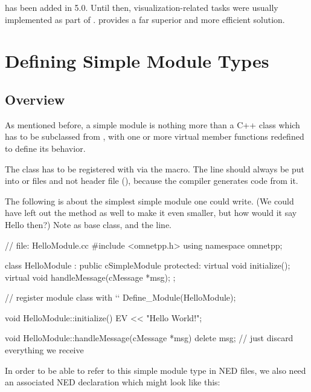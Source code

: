 \begin{note}
     has been added in {\opp} 5.0. Until then,
    visualization-related tasks were usually implemented as part of
    .  provides
    a far superior and more efficient solution.
\end{note}


\section{Defining Simple Module Types}
\label{sec:simple-modules:defining-simple-modules}

\subsection{Overview}
\label{sec:simple-modules:defining:overview}

As mentioned before, a simple module is nothing more
than a C++ class which has to be subclassed from ,
with one or more virtual member functions redefined to define its behavior.

The class has to be registered with {\opp} via the  macro.
The  line should always be put into  or 
files and not header file (), because the compiler generates code from it.

The following  is about the simplest simple module one could write.
(We could have left out the  method as well to make it even smaller,
but how would it say Hello then?) Note  as base class,
and the  line.

\begin{cpp}
// file: HelloModule.cc
#include <omnetpp.h>
using namespace omnetpp;

class HelloModule : public cSimpleModule
{
  protected:
    virtual void initialize();
    virtual void handleMessage(cMessage *msg);
};

// register module class with `\opp`
Define_Module(HelloModule);

void HelloModule::initialize()
{
    EV << "Hello World!\n";
}

void HelloModule::handleMessage(cMessage *msg)
{
    delete msg; // just discard everything we receive
}
\end{cpp}

In order to be able to refer to this simple module type
in NED files, we also need an associated NED declaration which might
look like this:

